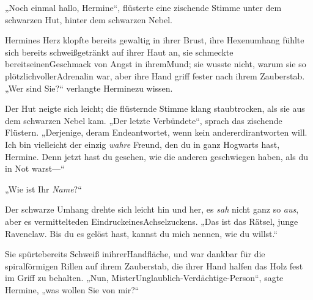 „Noch einmal hallo, Hermine“, flüsterte eine zischende Stimme unter dem schwarzen Hut, hinter dem schwarzen Nebel.

Hermines Herz klopfte bereits gewaltig in ihrer Brust, ihre Hexenumhang fühlte sich bereits schweißgetränkt auf ihrer Haut an, sie schmeckte bereitseinenGeschmack von Angst in ihremMund; sie wusste nicht, warum sie so plötzlichvollerAdrenalin war, aber ihre Hand griff fester nach ihrem Zauberstab. „Wer sind Sie?“ verlangte Herminezu wissen.

Der Hut neigte sich leicht; die flüsternde Stimme klang staubtrocken, als sie aus dem schwarzen Nebel kam. „Der letzte Verbündete“, sprach das zischende Flüstern. „Derjenige, deram Endeantwortet, wenn kein andererdirantworten will. Ich bin vielleicht der einzig \emph{wahre} Freund, den du in ganz Hogwarts hast, Hermine. Denn jetzt hast du gesehen, wie die anderen geschwiegen haben, als du in Not warst—“

„Wie ist Ihr \emph{Name}?“

Der schwarze Umhang drehte sich leicht hin und her, es \emph{sah} nicht ganz so \emph{aus}, aber es vermittelteden EindruckeinesAchselzuckens. „Das ist das Rätsel, junge Ravenclaw. Bis du es gelöst hast, kannst du mich nennen, wie du willst.“

Sie spürtebereits Schweiß inihrerHandfläche, und war dankbar für die spiralförmigen Rillen auf ihrem Zauberstab, die ihrer Hand halfen das Holz fest im Griff zu behalten. „Nun, MisterUnglaublich-Verdächtige-Person“, sagte Hermine, „was wollen Sie von mir?“

